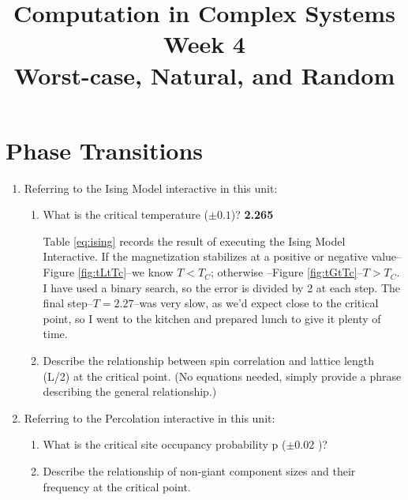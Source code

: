 \documentclass[]{article}
\title{Computation in Complex Systems\\
	Week 4\\Worst-case, Natural, and Random
	}
\begin{document}
\maketitle

\section{Phase Transitions}

\begin{enumerate}
	\item Referring to the Ising Model interactive in this unit:
	\begin{enumerate}
		\item What is the critical temperature ($\pm0.1$)? \textbf{2.265}
		
		Table \ref{eq:ising} records the result of executing the Ising Model Interactive. If the magnetization stabilizes at a positive or negative value--Figure \ref{fig:tLtTc}--we know $T<T_C$; otherwise --Figure \ref{fig:tGtTc}--$T>T_C$. I have used a binary search, so the error is divided by 2 at each step. The final step--$T=2.27$--was very slow, as we'd expect close to the critical point, so I went to the kitchen and prepared lunch to give it plenty of time.
		\item  Describe the relationship between spin correlation and lattice length (L/2) at the critical point. (No equations needed, simply provide a phrase describing the general relationship.)
	\end{enumerate}
	
	\item 	Referring to the Percolation interactive in this unit:
	\begin{enumerate}
		\item What is the critical site occupancy probability p ($\pm0.02$ )?
		
		\item Describe the relationship of non-giant component sizes and their frequency at the critical point.
	\end{enumerate}
\end{enumerate}
\end{document}
